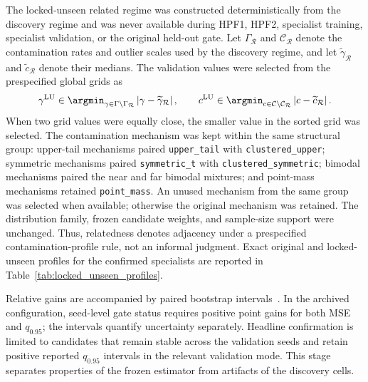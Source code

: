 The locked-unseen related regime was constructed deterministically from the discovery regime and was never available during HPF1, HPF2, specialist training, specialist validation, or the original held-out gate. Let $\Gamma_{\mathcal R}$ and $\mathcal C_{\mathcal R}$ denote the contamination rates and outlier scales used by the discovery regime, and let $\widetilde{\gamma}_{\mathcal R}$ and $\widetilde{c}_{\mathcal R}$ denote their medians. The validation values were selected from the prespecified global grids as
\[
\gamma^{\mathrm{LU}}
\in
\argmin_{\gamma\in\Gamma\setminus\Gamma_{\mathcal R}}
\left|\gamma-\widetilde{\gamma}_{\mathcal R}\right|,
\qquad
c^{\mathrm{LU}}
\in
\argmin_{c\in\mathcal C\setminus\mathcal C_{\mathcal R}}
\left|c-\widetilde{c}_{\mathcal R}\right|.
\]
When two grid values were equally close, the smaller value in the sorted grid was selected. The contamination mechanism was kept within the same structural group: upper-tail mechanisms paired \texttt{upper\_tail} with \texttt{clustered\_upper}; symmetric mechanisms paired \texttt{symmetric\_t} with \texttt{clustered\_symmetric}; bimodal mechanisms paired the near and far bimodal mixtures; and point-mass mechanisms retained \texttt{point\_mass}. An unused mechanism from the same group was selected when available; otherwise the original mechanism was retained. The distribution family, frozen candidate weights, and sample-size support were unchanged. Thus, relatedness denotes adjacency under a prespecified contamination-profile rule, not an informal judgment. Exact original and locked-unseen profiles for the confirmed specialists are reported in Table~\ref{tab:locked_unseen_profiles}.

Relative gains are accompanied by paired bootstrap intervals~\citep{efron1993bootstrap}. In the archived configuration, seed-level gate status requires positive point gains for both MSE and $q_{0.95}$; the intervals quantify uncertainty separately. Headline confirmation is limited to candidates that remain stable across the validation seeds and retain positive reported $q_{0.95}$ intervals in the relevant validation mode. This stage separates properties of the frozen estimator from artifacts of the discovery cells.

